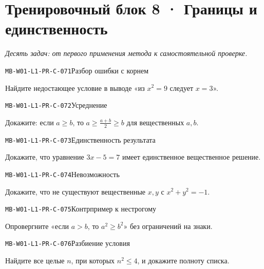 \documentclass[11pt,a4paper,openany]{book}
\newcommand{\muid}[1]{\texttt{\footnotesize #1}}
\begin{document}
\clearpage\section{Тренировочный блок 8 · Границы и единственность}

\textit{Десять задач: от первого применения метода к самостоятельной проверке.}\par

\noindent\hypertarget{MB-W01-L1-PR-C-071}{}\muid{MB-W01-L1-PR-C-071}\quad Разбор ошибки с корнем\par

Найдите недостающее условие в выводе «из $x^2=9$ следует $x=3$».\par\medskip

\noindent\hypertarget{MB-W01-L1-PR-C-072}{}\muid{MB-W01-L1-PR-C-072}\quad Усреднение\par

Докажите: если $a\ge b$, то $a\ge\frac{a+b}{2}\ge b$ для вещественных $a,b$.\par\medskip

\noindent\hypertarget{MB-W01-L1-PR-C-073}{}\muid{MB-W01-L1-PR-C-073}\quad Единственность результата\par

Докажите, что уравнение $3x-5=7$ имеет единственное вещественное решение.\par\medskip

\noindent\hypertarget{MB-W01-L1-PR-C-074}{}\muid{MB-W01-L1-PR-C-074}\quad Невозможность\par

Докажите, что не существуют вещественные $x,y$ с $x^2+y^2=-1$.\par\medskip

\noindent\hypertarget{MB-W01-L1-PR-C-075}{}\muid{MB-W01-L1-PR-C-075}\quad Контрпример к нестрогому\par

Опровергните «если $a>b$, то $a^2\ge b^2$» без ограничений на знаки.\par\medskip

\noindent\hypertarget{MB-W01-L1-PR-C-076}{}\muid{MB-W01-L1-PR-C-076}\quad Разбиение условия\par

Найдите все целые $n$, при которых $n^2\le4$, и докажите полноту списка.\par\medskip
\end{document}
